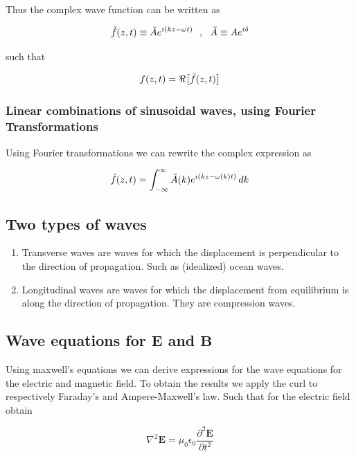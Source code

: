 \documentclass[a4paper]{article}
\begin{document}
Thus the complex wave function can be written as

\begin{equation}
    \Tilde{f}(z, t)\equiv \Tilde{A}e^{i(kz-\omega t)}\ \ , \ \ \Tilde{A}\equiv Ae^{i\delta}
\end{equation}

such that

\begin{equation}
    f(z, t) = \Re\big[\Tilde{f}(z, t)\big]
\end{equation}

\subsubsection*{Linear combinations of sinusoidal waves, using Fourier Transformations}

Using Fourier transformations we can rewrite the complex expression as

\begin{equation}
    \Tilde{f}(z, t) =\int_{-\infty}^{\infty} \Tilde{A}(k)e^{i(kz-\omega(k)t)}\,dk
\end{equation}

\subsection{Two types of waves}

\begin{enumerate}
    \item Transverse waves are waves for which the displacement is perpendicular to the direction of propagation. Such as (idealized) ocean waves.
    \item Longitudinal waves are waves for which the displacement from equilibrium is along the direction of propagation. They are compression waves.
\end{enumerate}

\subsection{Wave equations for $\bm{E}$ and $\bm{B}$}

Using maxwell's equations we can derive expressions for the wave equations for the electric and magnetic field. To obtain the results we apply the curl to respectively Faraday's and Ampere-Maxwell's law. Such that for the electric field obtain

\begin{equation}
    \nabla^2\bm{E}=\mu_0\epsilon_0\frac{\partial^2\bm{E}}{\partial t^2}
\end{equation}
\end{document}
